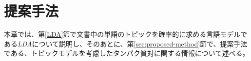 \documentclass[titlepage,12pt]{jreport}
\begin{document}

\chapter{提案手法\label{proposed_method}}
本章では、第\ref{LDA}節で文書中の単語のトピックを確率的に求める言語モデルである{\it LDA}について説明し、そのあとに、第\ref{sec:proposed-method}節で、提案手法である、トピックモデルを考慮したタンパク質対に関する情報について述べる。
\end{document}
